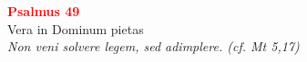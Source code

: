 


\def\greinitialformat#1{%
{\fontsize{39}{39}\selectfont #1}%
}




\vspace{0.3cm}
\begin{center}
 \textcolor{red}{\large \bf Psalmus 49}\\
Vera in Dominum pietas\\
\textit{\small Non veni solvere legem, sed adimplere. (cf. Mt 5,17)}
\end{center}
